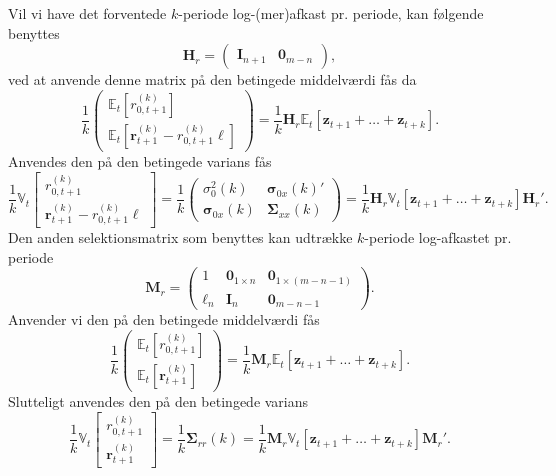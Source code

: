 \documentclass[
  a4paper,
  oneside]{memoir}
\begin{document}
Vil vi have det forventede \(k\)-periode log-(mer)afkast pr. periode, kan følgende benyttes
\begin{equation*}
        \bm{H}_r=\begin{pmatrix}\bm{I}_{n+1} & \bm{0}_{m-n}\end{pmatrix},
    \end{equation*}
ved at anvende denne matrix på den betingede middelværdi fås da
\begin{equation}
        \frac{1}{k}\begin{pmatrix}
        \mathbb{E}_t\left[ r_{0,t+1}^{(k)} \right]\\
        \mathbb{E}_t\left[ \bm{r}_{t+1}^{(k)}-r_{0,t+1}^{(k)}\bm{\bm{\ell}} \right]
        \end{pmatrix}=\frac{1}{k}\bm{H}_r\mathbb{E}_t[\bm{z}_{t+1}+\dots+\bm{z}_{t+k}].
    \end{equation}
Anvendes den på den betingede varians fås
\begin{equation}
        \frac{1}{k}\mathbb{V}_t\begin{bmatrix}
        r_{0,t+1}^{(k)}\\
        \bm{r}_{t+1}^{(k)}-r_{0,t+1}^{(k)}\bm{\bm{\ell}}
        \end{bmatrix}=\frac{1}{k}\begin{pmatrix}
        \sigma_0^2(k) & \bm{\sigma}_{0x}(k)'\\
        \bm{\sigma}_{0x}(k) & \bm{\Sigma}_{xx}(k)
        \end{pmatrix}=\frac{1}{k}\bm{H}_r\mathbb{V}_t[\bm{z}_{t+1}+\dots+\bm{z}_{t+k}]\bm{H}_r'.
    \end{equation}
Den anden selektionsmatrix som benyttes kan udtrække \(k\)-periode log-afkastet pr. periode
\begin{equation}
        \bm{M}_r=\begin{pmatrix}
        1 & \bm{0}_{1\times n} & \bm{0}_{1\times (m-n-1)}\\
        \bm{\bm{\ell}}_n & \bm{I}_n & \bm{0}_{m-n-1}
        \end{pmatrix}.\label{eq:sel}
    \end{equation}
Anvender vi den på den betingede middelværdi fås
\begin{equation}
        \frac{1}{k}\begin{pmatrix}
        \mathbb{E}_t\left[ r_{0,t+1}^{(k)} \right]\\
        \mathbb{E}_t\left[ \bm{r}_{t+1}^{(k)} \right]
        \end{pmatrix}=\frac{1}{k}\bm{M}_r\mathbb{E}_t[\bm{z}_{t+1}+\dots+\bm{z}_{t+k}].
    \end{equation}
Slutteligt anvendes den på den betingede varians
\begin{equation}
        \frac{1}{k}\mathbb{V}_t\begin{bmatrix}
        r_{0,t+1}^{(k)}\\
        \bm{r}_{t+1}^{(k)}
        \end{bmatrix}=\frac{1}{k}\bm{\Sigma}_{rr}(k)=\frac{1}{k}\bm{M}_r\mathbb{V}_t[\bm{z}_{t+1}+\dots+\bm{z}_{t+k}]\bm{M}_r'.\label{eq:bv}
    \end{equation}
\end{document}
